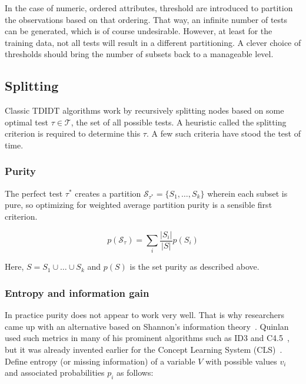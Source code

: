 In the case of numeric, ordered attributes, threshold are introduced to partition the observations based on that ordering. That way, an infinite number of tests can be generated, which is of course undesirable. However, at least for the training data, not all tests will result in a different partitioning. A clever choice of thresholds should bring the number of subsets back to a manageable level.


\subsection{Splitting}
Classic TDIDT algorithms work by recursively splitting nodes based on some optimal test $\tau \in \mathcal{T}$, the set of all possible tests. A heuristic called the splitting criterion is required to determine this $\tau$. A few such criteria have stood the test of time.

\subsubsection{Purity}
The perfect test $\tau^*$ creates a partition $\mathcal{S}_{\tau^*} = \{S_1, \ldots, S_k\}$ wherein each subset is pure, so optimizing for weighted average partition purity is a sensible first criterion.

\begin{equation}
    p(\mathcal{S}_\tau) = \sum_i \frac{|S_i|}{|S|} p(S_i)
\end{equation}

Here, $S = S_1 \cup \ldots \cup S_k$ and $p(S)$ is the set purity as described above.

\subsubsection{Entropy and information gain}
In practice purity does not appear to work very well. That is why researchers came up with an alternative based on Shannon's information theory~\cite{shannon1948mathematical}. Quinlan used such metrics in many of his prominent algorithms such as ID3 and C4.5~\cite{id3ter, c45}, but it was already invented earlier for the Concept Learning System (CLS)~\cite{cls}. Define entropy (or missing information) of a variable $V$ with possible values $v_i$ and associated probabilities $p_i$ as follows:

